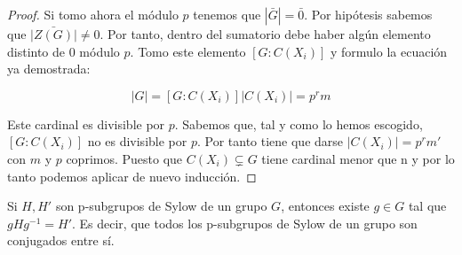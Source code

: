 \documentclass[nochap]{apuntes}
\begin{document}
\begin{proof}
  Si tomo ahora el módulo $p$ tenemos que $|\bar{G}|=\bar{0}$. Por hipótesis sabemos que $\bar{|Z(G)|} \neq 0$. Por tanto, dentro del
  sumatorio debe haber algún elemento distinto de 0 módulo $p$. Tomo este elemento $[G:C(X_i)]$  y formulo la ecuación ya
  demostrada:

  \[|G|=[G:C(X_i)]|C(X_i)|=p^{r}m\]

  Este cardinal es divisible por $p$. Sabemos que, tal y como lo hemos escogido, $[G:C(X_i)]$  no es divisible por $p$. Por tanto tiene que darse $|C(X_i)|=p^{r}m'$  con $m$ y $p$ coprimos. Puesto que $C(X_i) \varsubsetneq G$  tiene cardinal menor que n y por lo tanto podemos aplicar de nuevo inducción.
\end{proof}

\begin{theorem}
Si $H, H'$ son p-subgrupos de Sylow de un grupo $G$, entonces existe $g∈G$ tal que $gHg^{-1}=H'$. Es decir, que todos los p-subgrupos de Sylow de un grupo son conjugados entre sí.
\end{theorem}
\end{document}
